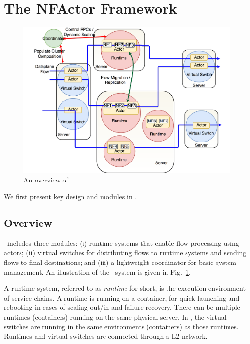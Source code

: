\section {The NFActor Framework}

\begin{figure}[!t]
  \centering
  \includegraphics[width=\columnwidth]{figure/new-nfactor-cluster.pdf}
  \caption{An overview of \nfactor.}
  \label{fig:runtime}
\end{figure}

We first present key design and modules in \nfactor.

\subsection{Overview}
\label{sec:overview}

\nfactor~includes three modules: (i) runtime systems that enable flow processing using actors; (ii) virtual switches for distributing flows to runtime systems and sending flows to final destinations; and (iii) a lightweight coordinator for basic system management. %
 An illustration of the \nfactor~system is given in Fig.~\ref{fig:runtime}.

A runtime system, referred to as \textit{runtime} for short, is the execution environment of service chains. A runtime is running on a container, for quick launching and rebooting in cases of scaling out/in and failure recovery. There can be multiple runtimes (containers) running on the same physical server. In \nfactor, the virtual switches are running in the same environments (containers) as those runtimes. %
 Runtimes and virtual switches are connected through a L2 network.

